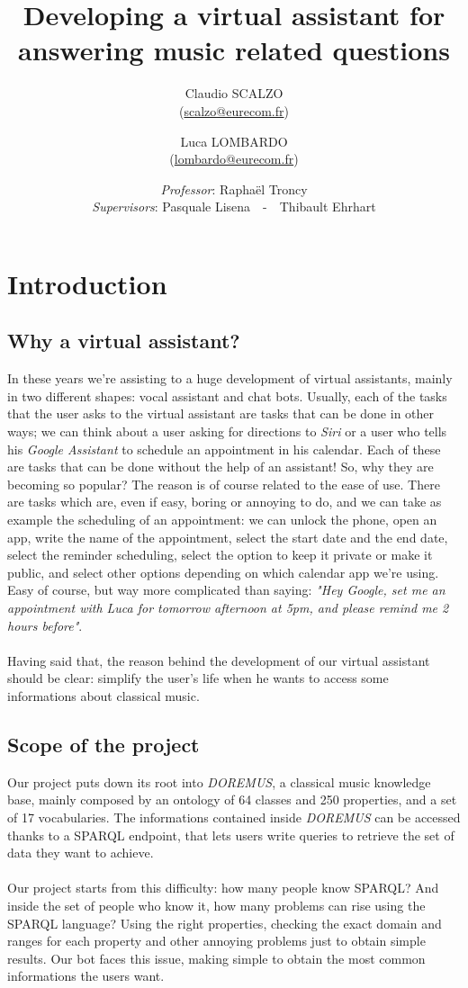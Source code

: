 \documentclass[a4paper,12pt]{report}
\title{Developing a virtual assistant for answering music related questions}
\author{Claudio SCALZO \\ (\href{mailto:scalzo@eurecom.fr}{scalzo@eurecom.fr}) \and Luca LOMBARDO \\ (\href{mailto:lombardo@eurecom.fr}{lombardo@eurecom.fr}) }
\date{\textit{Professor}: Raphaël Troncy\\\textit{Supervisors}: Pasquale Lisena~~-~~Thibault Ehrhart}
\begin{document}
\maketitle
\tableofcontents

\chapter{Introduction}
	\section{Why a virtual assistant?}
	In these years we're assisting to a huge development of virtual assistants, mainly in two different shapes: vocal assistant and chat bots. Usually, each of the tasks that the user asks to the virtual assistant are tasks that can be done in other ways; we can think about a user asking for directions to \textit{Siri} or a user who tells his \textit{Google Assistant} to schedule an appointment in his calendar. Each of these are tasks that can be done without the help of an assistant! So, why they are becoming so popular? The reason is of course related to the ease of use. There are tasks which are, even if easy, boring or annoying to do, and we can take as example the scheduling of an appointment: we can unlock the phone, open an app, write the name of the appointment, select the start date and the end date, select the reminder scheduling, select the option to keep it private or make it public, and select other options depending on which calendar app we're using. Easy of course, but way more complicated than saying: \textit{"Hey Google, set me an appointment with Luca for tomorrow afternoon at 5pm, and please remind me 2 hours before"}.\\\\
	Having said that, the reason behind the development of our virtual assistant should be clear: simplify the user's life when he wants to access some informations about classical music.
	
	\section{Scope of the project}
	Our project puts down its root into \textit{DOREMUS}\cite{doremus}, a classical music knowledge base, mainly composed by an ontology of 64 classes and 250 properties, and a set of 17 vocabularies. The informations contained inside \textit{DOREMUS} can be accessed thanks to a SPARQL endpoint, that lets users write queries to retrieve the set of data they want to achieve.\\\\
	Our project starts from this difficulty: how many people know SPARQL? And inside the set of people who know it, how many problems can rise using the SPARQL language? Using the right properties, checking the exact domain and ranges for each property and other annoying problems just to obtain simple results. Our bot faces this issue, making simple to obtain the most common informations the users want.
	
\end{document}
